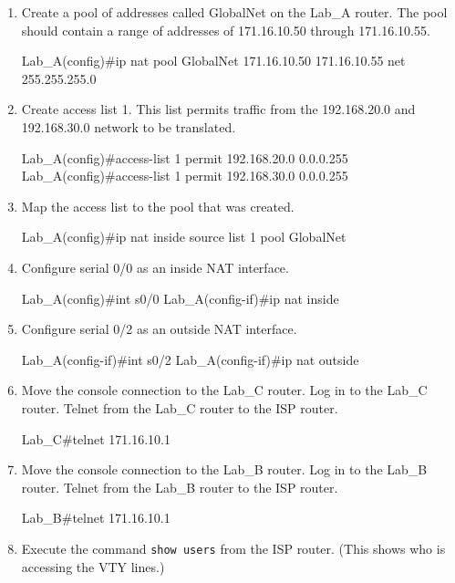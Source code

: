 \begin{enumerate}
\item
  Create a pool of addresses called GlobalNet on the Lab\_A router. The
  pool should contain a range of addresses of 171.16.10.50 through
  171.16.10.55.

\begin{cli}
Lab_A(config)#ip nat pool GlobalNet 171.16.10.50 171.16.10.55
net 255.255.255.0
\end{cli}
\item
  Create access list
  1. This list permits traffic from the 192.168.20.0 and 192.168.30.0
  network to be translated.

\begin{cli}
Lab_A(config)#access-list 1 permit 192.168.20.0 0.0.0.255
Lab_A(config)#access-list 1 permit 192.168.30.0 0.0.0.255
\end{cli}
\item
  Map the access list to the pool that was created.

\begin{cli}
Lab_A(config)#ip nat inside source list 1 pool GlobalNet
\end{cli}
\item
  Configure serial 0/0 as an inside NAT interface.

\begin{cli}
Lab_A(config)#int s0/0
Lab_A(config-if)#ip nat inside
\end{cli}
\item
  Configure serial 0/2 as an outside NAT interface.

\begin{cli}
Lab_A(config-if)#int s0/2
Lab_A(config-if)#ip nat outside
\end{cli}
\item
  Move the console connection to the Lab\_C router. Log in to the Lab\_C
  router. Telnet from the Lab\_C router to the ISP router.

\begin{cli}
Lab_C#telnet 171.16.10.1
\end{cli}
\item
  Move the console connection to the Lab\_B router. Log in to the Lab\_B
  router. Telnet from the Lab\_B router to the ISP router.

\begin{cli}
Lab_B#telnet 171.16.10.1
\end{cli}
\item
  Execute the command \texttt{show\ users} from the ISP router. (This
  shows who is accessing the VTY lines.)


\end{enumerate}
